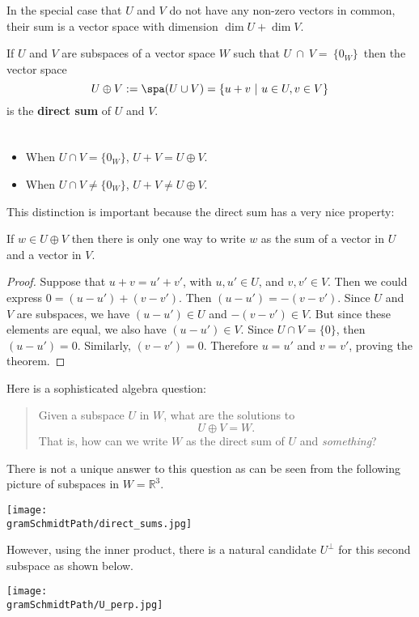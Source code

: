 In the special case that $U$ and $V$ do not have any non-zero vectors in common, their sum is a vector space with dimension $\dim U + \dim V$. 


\begin{definition}
If  $U$ and $V$ are subspaces of a vector space $W$ such that 
$U~\cap~V=~\{0_W\}\, $
then the vector space
\[
U \oplus V := \spa (U\cup V)= \{u+v ~|~ u\in U, v\in V \}
\]
is the {\bfseries direct sum} of $U$ and $V$.
\end{definition}

\begin{remark}

$\phantom{JUNK HERE}$\\[-8mm]

\begin{itemize}
\item When $U\cap V= \{0_W\}$, $U+V=U\oplus V.$ 
\item When $U\cap V \neq \{0_W\}$, $U+V \neq U\oplus V$.
\end{itemize}
\end{remark}

\noindent This distinction is important because the direct sum has a very nice property:

\begin{theorem}
If $w\in U\oplus V$  then 
there is only one way to write \(w\) as the sum of a vector in \(U\) and a vector in \(V\).  
\end{theorem}

\begin{proof}
Suppose that $u+v=u'+v'$, with $u,u'\in U$, and $v,v' \in V$.  Then we could express $0=(u-u')+(v-v')$.  Then $(u-u')=-(v-v')$.  Since $U$ and $V$ are subspaces, we have $(u-u')\in U$ and $-(v-v')\in V$.  But since these elements are equal, we also have $(u-u')\in V$.  Since $U\cap V=\{0\}$, then $(u-u')=0$.  Similarly, $(v-v')=0$. Therefore $u=u'$ and  $v=v'$, proving the theorem. 
\end{proof}



\noindent Here is a sophisticated algebra question:
\begin{quote}
Given a subspace $U$ in $W$, what are the solutions to 
\[ U\oplus V =W.\]
That is, how can we write $W$ as the direct sum of $U$ and \emph{something}? 
\end{quote}
There is not a unique answer to this question as can be seen from the following picture of subspaces in $W={\mathbb R}^3$. 
\begin{center}
\texttt{[image: \\gramSchmidtPath/direct\_sums.jpg]}
\end{center}
However, using the inner product, there is a natural candidate $U^\perp$ for this second subspace as shown below.
\begin{center}
\texttt{[image: \\gramSchmidtPath/U\_perp.jpg]}
\end{center}


